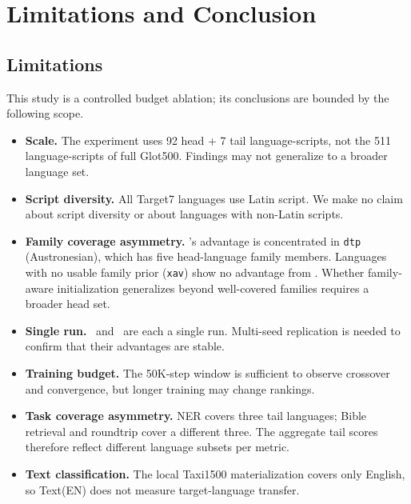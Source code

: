 \section{Limitations and Conclusion}

\subsection{Limitations}

This study is a controlled budget ablation; its conclusions are bounded by the following scope.

\begin{itemize}
  \item \textbf{Scale.} The experiment uses 92 head + 7 tail language-scripts, not the 511
        language-scripts of full Glot500.
        Findings may not generalize to a broader language set.

  \item \textbf{Script diversity.} All Target7 languages use Latin script.
        We make no claim about script diversity or about languages with non-Latin scripts.

  \item \textbf{Family coverage asymmetry.} \famm's advantage is concentrated in
        \texttt{dtp} (Austronesian), which has five head-language family members.
        Languages with no usable family prior (\texttt{xav}) show no advantage from \famm.
        Whether family-aware initialization generalizes beyond well-covered families
        requires a broader head set.

  \item \textbf{Single run.} \wfvt\ and \famm\ are each a single run.
        Multi-seed replication is needed to confirm that their advantages are stable.

  \item \textbf{Training budget.} The 50K-step window is sufficient to observe crossover
        and convergence, but longer training may change rankings.

  \item \textbf{Task coverage asymmetry.} NER covers three tail languages; Bible retrieval
        and roundtrip cover a different three.
        The aggregate tail scores therefore reflect different language subsets per metric.

  \item \textbf{Text classification.} The local Taxi1500 materialization covers only English,
        so Text(EN) does not measure target-language transfer.
\end{itemize}

